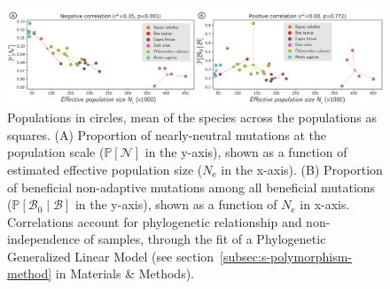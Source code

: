 \documentclass{article}
\newcommand{\Ne}{N_{\text{e}}}
\newcommand{\proba}{\mathbb{P}}
\newcommand{\SphyBen}{\mathcal{B}_0}
\newcommand{\given}{\mid}
\newcommand{\SpopNeu}{\mathcal{N}}
\newcommand{\SpopBen}{\mathcal{B}}
\begin{document}
    \begin{figure}[!ht]
        \centering
        \includegraphics[width=\textwidth, page=1] {artworks/figure.diversity}
        \caption{
            Populations in circles, mean of the species across the populations as squares.
            (A) Proportion of nearly-neutral mutations at the population scale ($\proba [ \SpopNeu]$ in the y-axis), shown as a function of estimated effective population size ($\Ne$ in the x-axis).
            (B) Proportion of beneficial non-adaptive mutations among all beneficial mutations ($\proba [ \SphyBen  \given  \SpopBen]$ in the y-axis), shown as a function of $\Ne$ in x-axis.
            Correlations account for phylogenetic relationship and non-independence of samples, through the fit of a Phylogenetic Generalized Linear Model (see section~\ref{subsec:s-polymorphism-method} in Materials \& Methods).
        }
        \label{fig:diversity}
    \end{figure}
\end{document}
